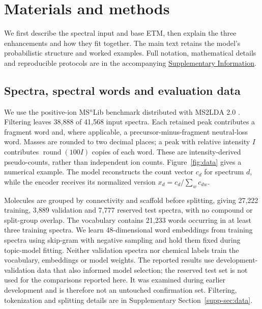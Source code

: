 \documentclass[10pt,a4paper]{article}
\begin{document}
\section{Materials and methods}

We first describe the spectral input and base ETM, then explain the three
enhancements and how they fit together. The main text retains the model's
probabilistic structure and worked examples. Full notation, mathematical
details and reproducible protocols are in the accompanying
\href{contextual_sparse_etm_supplement.pdf}{Supplementary Information}.

\subsection{Spectra, spectral words and evaluation data}

We use the positive-ion MS$^{n}$Lib benchmark distributed with MS2LDA 2.0
\cite{brungs2025,msnlibdata}. Filtering leaves 38,888 of 41,568 input spectra.
Each retained peak contributes a fragment word and, where applicable, a
precursor-minus-fragment neutral-loss word. Masses are rounded to two decimal
places; a peak with relative intensity $I$ contributes $\operatorname{round}(100I)$
copies of each word. These are intensity-derived pseudo-counts, rather than
independent ion counts. Figure~\ref{fig:data} gives a numerical example.
The model reconstructs the count vector $c_d$ for spectrum $d$, while the
encoder receives its normalized version $x_d=c_d/\sum_w c_{dw}$.

Molecules are grouped by connectivity and scaffold before splitting, giving
27,222 training, 3,889 validation and 7,777 reserved test spectra, with no
compound or split-group overlap. The vocabulary contains 21,233 words
occurring in at least three training spectra. We learn 48-dimensional word
embeddings from training spectra using skip-gram with negative sampling
\cite{mikolov2013} and hold them fixed during topic-model fitting.
Neither validation spectra nor chemical labels train the vocabulary,
embeddings or model weights. The reported results use development-validation
data that also informed model selection; the reserved test set is not used
for the comparisons reported here. It was examined during earlier development
and is therefore not an untouched confirmation set.
Filtering, tokenization and splitting details are in Supplementary
Section~\ref{supp-sec:data}.


\end{document}
